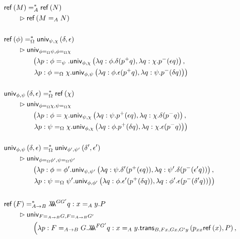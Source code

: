 \begin{align*}
& \reff{M} =^*_A \reff{N}  \\ & \qquad \rhd \reff{M =_A N} \\ \\
& \reff{\phi} =^*_\Omega \univ{\psi}{\chi}{\delta}{\epsilon}  \\ & \qquad \rhd 
  \mathsf{univ}_{\phi =_\Omega \psi,\phi =_\Omega \chi} \\
&  \qquad \qquad \left( \lambda p:\phi =_\psi. \univ{\phi}{\chi}{\lambda q:\phi.\delta (p^+ q)}
    {\lambda q : \chi. p^- (\epsilon q)}, \right. \\ 
&  \qquad \qquad \left. \lambda p:\phi =_\Omega \chi. \univ{\phi}{\psi}{\lambda q:\phi. \epsilon (p^+ q)}
    {\lambda q : \psi. p^- (\delta q)} \right) \\ \\
& \univ{\phi}{\psi}{\delta}{\epsilon} =^*_\Omega \reff{\chi}  \\ & \qquad \rhd
  \mathsf{univ}_{\phi =_\Omega \chi, \psi =_\Omega \chi} \\
& \qquad \qquad   \left( \lambda p:\phi = \chi . \univ{\psi}{\chi}{\lambda q:\psi. p^+ (\epsilon q)}
      {\lambda q:\chi. \delta (p^- q)}, \right. \\
& \qquad \qquad   \left. \lambda p:\psi =_\Omega \chi. \univ{\phi}{\chi}{\lambda q:\phi. p^+ (\delta q)}
      {\lambda q:\chi. \epsilon (p^- q)} \right) \\ \\
& \univ{\phi}{\psi}{\delta}{\epsilon} =^*_\Omega \univ{\phi'}{\psi'}{\delta'}{\epsilon'}
 \\ & \qquad \rhd
\mathsf{univ}_{\phi =_\Omega \phi', \psi =_\Omega \psi'} \\
& \qquad \qquad \left( \lambda p:\phi = \phi'. \univ{\psi}{\psi'}{\lambda q:\psi. \delta' (p^+ (\epsilon q))}{\lambda q:\psi' . \delta (p^-(\epsilon' q))}, \right. \\
& \qquad \qquad \left. \lambda p:\psi=_\Omega \psi' . \univ{\phi}{\phi'}{\lambda q:\phi. \epsilon' (p^+ (\delta q))}{\lambda q:\phi' . \epsilon (p^- (\delta' q))} \right) \\ \\
& \reff{F} =^*_{A \rightarrow B} \triplelambda^{G G'} q:x =_A y. P
 \\ & \qquad \rhd
\mathsf{univ}_{F =_{A \rightarrow B} G, F =_{A \rightarrow B} G'} \\
& \qquad \qquad \left( \lambda p : F =_{A \rightarrow B} G. \triplelambda^{F G'} q : x =_A y. 
\trans{B}{Fx}{Gx}{G'y}{p_{xx} \reff{x}}{P}, \right. \\

\end{align*}
